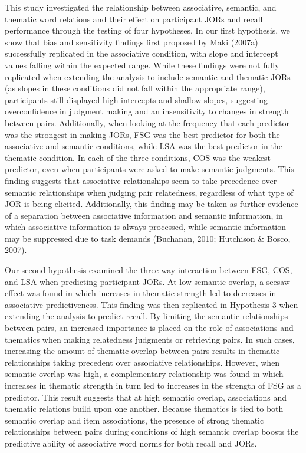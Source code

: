 \documentclass[english,,man]{apa6}
\begin{document}
This study investigated the relationship between associative, semantic,
and thematic word relations and their effect on participant JORs and
recall performance through the testing of four hypotheses. In our first
hypothesis, we show that bias and sensitivity findings first proposed by
Maki (2007a) successfully replicated in the associative condition, with
slope and intercept values falling within the expected range. While
these findings were not fully replicated when extending the analysis to
include semantic and thematic JORs (as slopes in these conditions did
not fall within the appropriate range), participants still displayed
high intercepts and shallow slopes, suggesting overconfidence in
judgment making and an insensitivity to changes in strength between
pairs. Additionally, when looking at the frequency that each predictor
was the strongest in making JORs, FSG was the best predictor for both
the associative and semantic conditions, while LSA was the best
predictor in the thematic condition. In each of the three conditions,
COS was the weakest predictor, even when participants were asked to make
semantic judgments. This finding suggests that associative relationships
seem to take precedence over semantic relationships when judging pair
relatedness, regardless of what type of JOR is being elicited.
Additionally, this finding may be taken as further evidence of a
separation between associative information and semantic information, in
which associative information is always processed, while semantic
information may be suppressed due to task demands (Buchanan, 2010;
Hutchison \& Bosco, 2007).

Our second hypothesis examined the three-way interaction between FSG,
COS, and LSA when predicting participant JORs. At low semantic overlap,
a seesaw effect was found in which increases in thematic strength led to
decreases in associative predictiveness. This finding was then
replicated in Hypothesis 3 when extending the analysis to predict
recall. By limiting the semantic relationships between pairs, an
increased importance is placed on the role of associations and thematics
when making relatedness judgments or retrieving pairs. In such cases,
increasing the amount of thematic overlap between pairs results in
thematic relationships taking precedent over associative relationships.
However, when semantic overlap was high, a complementary relationship
was found in which increases in thematic strength in turn led to
increases in the strength of FSG as a predictor. This result suggests
that at high semantic overlap, associations and thematic relations build
upon one another. Because thematics is tied to both semantic overlap and
item associations, the presence of strong thematic relationships between
pairs during conditions of high semantic overlap boosts the predictive
ability of associative word norms for both recall and JORs.
\end{document}
